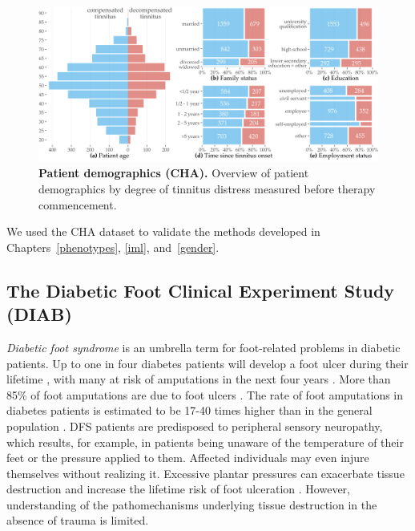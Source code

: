\documentclass[
  oneside]{book}
\begin{document}
\begin{figure}[htb]
\includegraphics[width=1\linewidth]{figures/02-cha-patients-summary} \caption[fig.scap]{\textbf{Patient demographics (CHA).} Overview of patient demographics by degree of tinnitus distress measured before therapy commencement.}\label{fig:02-cha-patient-demographics-plot}
\end{figure}

We used the CHA dataset to validate the methods developed in Chapters~\ref{phenotypes}, \ref{iml}, and~\ref{gender}.

\hypertarget{background-data-diab}{%
\subsection{The Diabetic Foot Clinical Experiment Study (DIAB)}\label{background-data-diab}}

\emph{Diabetic foot syndrome} is an umbrella term for foot-related problems in diabetic patients.
Up to one in four diabetes patients will develop a foot ulcer during their lifetime \autocite{RN1}, with many at risk of amputations in the next four years \autocite{RN2}.
More than 85\% of foot amputations are due to foot ulcers \autocite{RN3,RN4}.
The rate of foot amputations in diabetes patients is estimated to be 17-40 times higher than in the general population \autocite{RN12}.
DFS patients are predisposed to peripheral sensory neuropathy, which results, for example, in patients being unaware of the temperature of their feet or the pressure applied to them.
Affected individuals may even injure themselves without realizing it.
Excessive plantar pressures can exacerbate tissue destruction and increase the lifetime risk of foot ulceration \autocite{SinghEtAl:PreventingFootUlcers2005}.
However, understanding of the pathomechanisms underlying tissue destruction in the absence of trauma is limited.
\end{document}
